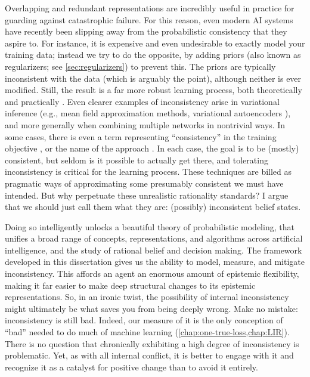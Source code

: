 Overlapping and redundant representations are incredibly useful in practice for guarding against catastrophic failure. 
For this reason, even modern AI systems have recently been slipping away from the probabilistic consistency that they aspire to.
For instance, it is expensive and even undesirable to exactly model your training data; instead we try to do the opposite, by adding priors (also known as regularizers; see \cref{sec:regularizers}) to prevent this.
The priors are typically inconsistent with the data (which is arguably the point), although neither is ever modified. 
Still, the result is a far more robust learning process, both theoretically \citep{ftrl} and practically \citep{girosi1995regularization}.
%
Even clearer examples of inconsistency arise in variational inference
    (e.g., mean field approximation methods, variational autoencoders \citep{kingma2013autoencoding}),
    and more generally when combining multiple networks in nontrivial ways.
    In some cases, there is even a term representing ``consistency'' in the training objective \citep{CycleGAN2017}, or the name of the approach \citep{learning-loc-glob-consistency,temp-cycle-consist-2019CVPR}. 
In each case, the goal is to be (mostly) consistent, but seldom is it possible to actually get there,
and tolerating inconsistency is critical for the learning process.
%
These techniques are billed
    as pragmatic ways of approximating
    some presumably consistent we must have intended.
But why perpetuate these unrealistic rationality standards?
I argue that we should just call them what they are: (possibly) inconsistent belief states.

Doing so intelligently unlocks a beautiful theory of probabilistic modeling, that unifies a broad range of concepts, representations, and algorithms across artificial intelligence, and 
    the study of rational belief and decision making.
The framework developed in this dissertation
gives us the ability to model, measure, and mitigate inconsistency.
This affords an agent an enormous amount of epistemic flexibility,
    making it far easier to make deep structural changes to its epistemic
    representations.
So, in an ironic twist, the possibility of internal inconsistency might ultimately be what saves you from being deeply wrong. 
%
Make no mistake: inconsistency is still bad.
Indeed, our measure of it is the only conception of ``bad'' needed to do much of machine learning (\cref{chap:one-true-loss,chap:LIR}).
There is no question that chronically exhibiting a high degree of inconsistency is problematic.
%
Yet, as with all internal conflict, it is better to engage with it and recognize it as a catalyst for positive change
than to avoid it entirely. 

